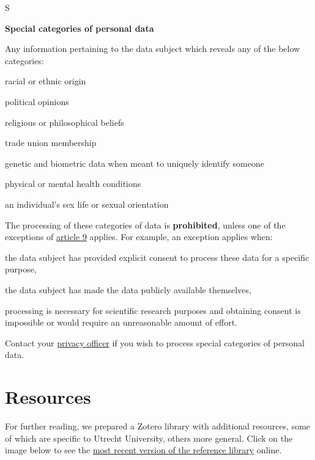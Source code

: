 \documentclass[
]{book}
\begin{document}
S

\textbf{Special categories of personal data}

Any information pertaining to the data subject which reveals any of the below categories:

racial or ethnic origin

political opinions

religious or philosophical beliefs

trade union membership

genetic and biometric data when meant to uniquely identify someone

physical or mental health conditions

an individual's sex life or sexual orientation

The processing of these categories of data is \textbf{prohibited}, unless one of the exceptions of \href{https://gdpr-info.eu/art-9-gdpr/}{article 9} applies. For example, an exception applies when:

the data subject has provided explicit consent to process these data for a specific purpose,

the data subject has made the data publicly available themselves,

processing is necessary for scientific research purposes and obtaining consent is impossible or would require an unreasonable amount of effort.

Contact your \protect\hyperlink{support}{privacy officer} if you wish to process special categories of personal data.

\hypertarget{references}{%
\chapter{Resources}\label{references}}

For further reading, we prepared a Zotero library with additional resources, some
of which are specific to Utrecht University, others more general. Click on the
image below to see the
\href{https://www.zotero.org/groups/2554340/data_privacy_uu/library}{most recent version of the reference library}
online.

  
\end{document}
